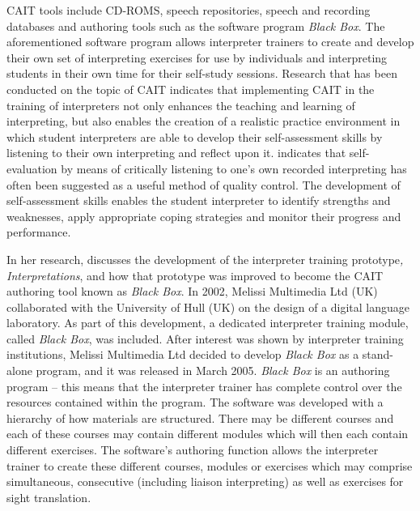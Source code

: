 \documentclass[output=paper]{langsci/langscibook}
\begin{document}
\textsc{CAIT} tools include CD-ROMS, speech repositories, speech and recording databases and authoring tools such as the software program \textit{Black Box}. The aforementioned software program allows interpreter trainers to create and develop their own set of interpreting exercises for use by individuals and interpreting students in their own time for their self-study sessions. Research that has been conducted on the topic of \textsc{CAIT} \citep{Sandrelli2007a,Pinazo2008,Lim2014} indicates that implementing \textsc{CAIT} in the training of interpreters not only enhances the teaching and learning of interpreting, but also enables the creation of a realistic practice environment in which student interpreters are able to develop their self-assessment skills by listening to their own interpreting and reflect upon it. \citet[252]{Bartlomiejczyk2007} indicates that self-evaluation by means of critically listening to one’s own recorded interpreting has often been suggested as a useful method of quality control. The development of self-assessment skills enables the student interpreter to identify strengths and weaknesses, apply appropriate coping strategies and monitor their progress and performance.

In her research, \citet{Sandrelli2007b} discusses the development of the interpreter training prototype\textit{, Interpretations}, and how that prototype was improved to become the \textsc{CAIT} authoring tool known as \textit{Black Box}. In 2002, Melissi Multimedia Ltd (UK) collaborated with the University of Hull (UK) on the design of a digital language laboratory. As part of this development, a dedicated interpreter training module, called \textit{Black Box}, was included. After interest was shown by interpreter training institutions, Melissi Multimedia Ltd decided to develop \textit{Black Box} as a stand-alone program, and it was released in March 2005. \textit{Black Box} is an authoring program – this means that the interpreter trainer has complete control over the resources contained within the program. The software was developed with a hierarchy of how materials are structured. There may be different courses and each of these courses may contain different modules which will then each contain different exercises. The software’s authoring function allows the interpreter trainer to create these different courses, modules or exercises which may comprise simultaneous, consecutive (including liaison interpreting) as well as exercises for sight translation. 
\end{document}
